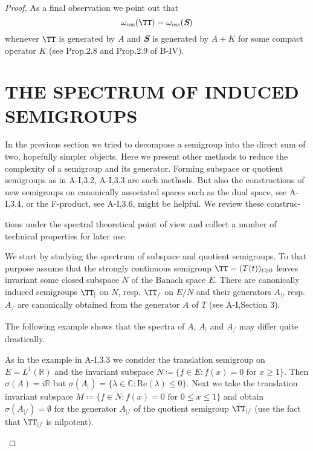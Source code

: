 \begin{proof}
As a final observation we point out that
\begin{equation}\label{eq:a3-3.12}
	\omega_{\text{ess}}(\TT) = \omega_{\text{ess}}({\textit{\textbf S}})
\end{equation}
whenever $\TT$ is generated by $A$ and ${\textit{\textbf S}}$ is generated by $A + K$ for some compact operator $K$ (see Prop.2.8 and Prop.2.9 of B-IV).

\section{THE SPECTRUM OF INDUCED SEMIGROUPS}\label{sec:a3-4}

In the previous section we tried to decompose a semigroup into the direct sum of two, hopefully simpler objects.
Here we present other methods to reduce the complexity of a semigroup and its generator.
Forming subspace or quotient semigroups as in A-I,3.2, A-I,3.3 are such methods.
But also the constructions of new semigroups on canonically associated spaces such as the dual space, see A-I,3.4, or the F-product, see A-I,3.6, might be helpful.
We review these construc-



\newpage
tions under the spectral theoretical point of view and collect a number of technical properties for later use.

We start by studying the spectrum of subspace and quotient semigroups.
To that purpose assume that the strongly continuous semigroup $\TT = (T(t))_{t \geq 0}$ leaves invariant some closed subspace $N$ of the Banach space $E$.
There are canonically induced semigroups $\TT_{|}$ on $N$, resp. $\TT_{/}$ on $E/N$ and their generators $A_{|}$, resp. $A_{/}$ are canonically obtained from the generator $A$ of $T$ (see A-I,Section 3).

The following example shows that the spectra of $A$, $A_{|}$ and $A_{/}$ may differ quite drastically.

\begin{example}\label{ex:a3-4.1}
	
	As in the example in A-I,3.3 we consider the translation semigroup on $E = L^{1}(\mathbb{R})$ and the invariant subspace $N \coloneqq \{f \in E \colon f(x) = 0 \text{ for } x \geq 1\}$.
	Then $\sigma(A) = i\mathbb{R}$ but $\sigma(A_{|}) = \{\lambda \in \mathbb{C} \colon \text{Re}(\lambda) \leq 0\}$.
	Next we take the translation invariant subspace $M \coloneqq \{f \in N \colon f(x) = 0 \text{ for } 0 \leq x \leq 1\}$ and obtain $\sigma(A_{|/}) = \emptyset$ for the generator $A_{|/}$ of the quotient semigroup $\TT_{|/}$ (use the fact that $\TT_{|/}$ is nilpotent).
\end{example}


\end{proof}
